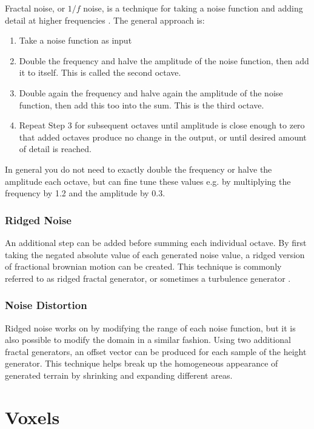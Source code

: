 Fractal noise, or \(1/f\) noise, is a technique for taking a noise function and adding detail at higher frequencies \cite{perlin}.
The general approach is:
\begin{enumerate}
\item Take a noise function as input
\item Double the frequency and halve the amplitude of the noise function, then add it to itself. This is called the second octave.
\item Double again the frequency and halve again the amplitude of the noise function, then add this too into the sum. This is the third octave.
\item Repeat Step 3 for subsequent octaves until amplitude is close enough to zero that added octaves produce no change in the output, or until desired amount of detail is reached.
\end{enumerate}

In general you do not need to exactly double the frequency or halve the amplitude each octave, but can fine tune these values e.g. by multiplying the frequency by 1.2 and the amplitude by 0.3.

\subsubsection{Ridged Noise}

An additional step can be added before summing each individual octave.
By first taking the negated absolute value of each generated noise value, a ridged version of fractional brownian motion can be created.
This technique is commonly referred to as ridged fractal generator, or sometimes a turbulence generator \cite{perlin}.

\subsubsection{Noise Distortion}

Ridged noise works on by modifying the range of each noise function, but it is also possible to modify the domain in a similar fashion.
Using two additional fractal generators, an offset vector can be produced for each sample of the height generator.
This technique helps break up the homogeneous appearance of generated terrain by shrinking and expanding different areas.


\section{Voxels} \label{voxels}

